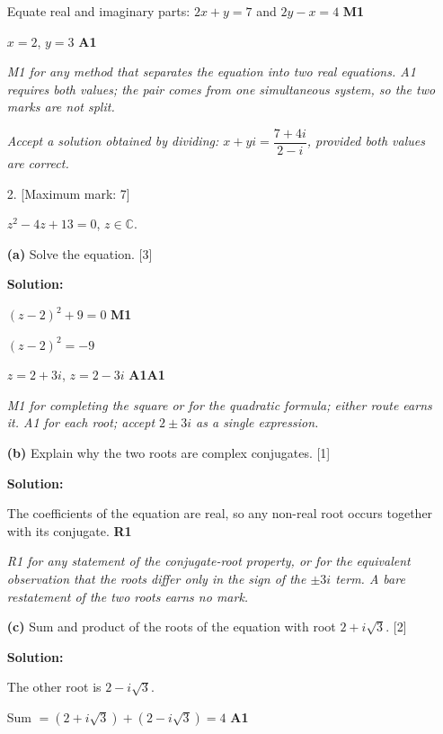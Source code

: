 \documentclass[12pt, twoside]{article}
\begin{document}
\begin{enumerate}[itemsep=0.3cm]
Equate real and imaginary parts: $2x + y = 7$ and $2y - x = 4$
\hfill \textbf{M1}

$x = 2$, $y = 3$ \hfill \textbf{A1}

\emph{M1 for any method that separates the equation into two real
equations. A1 requires both values; the pair comes from one simultaneous
system, so the two marks are not split.}

\emph{Accept a solution obtained by dividing: $x + yi = \dfrac{7+4i}{2-i}$,
provided both values are correct.}

\newpage

\item[2.] [Maximum mark: 7]

$z^2 - 4z + 13 = 0$, $z \in \mathbb{C}$.

\medskip

\textbf{(a)} Solve the equation. \hfill [3]

\textbf{Solution:}

$(z - 2)^2 + 9 = 0$ \hfill \textbf{M1}

$(z-2)^2 = -9$

$z = 2 + 3i$, $z = 2 - 3i$ \hfill \textbf{A1A1}

\emph{M1 for completing the square or for the quadratic formula; either
route earns it. A1 for each root; accept $2 \pm 3i$ as a single
expression.}

\medskip

\textbf{(b)} Explain why the two roots are complex conjugates. \hfill [1]

\textbf{Solution:}

The coefficients of the equation are real, so any non-real root occurs
together with its conjugate. \hfill \textbf{R1}

\emph{R1 for any statement of the conjugate-root property, or for the
equivalent observation that the roots differ only in the sign of the
$\pm 3i$ term. A bare restatement of the two roots earns no mark.}

\medskip

\textbf{(c)} Sum and product of the roots of the equation with root
$2 + i\sqrt{3}$. \hfill [2]

\textbf{Solution:}

The other root is $2 - i\sqrt{3}$.

Sum $= (2 + i\sqrt{3}) + (2 - i\sqrt{3}) = 4$ \hfill \textbf{A1}


\end{enumerate}
\end{document}
